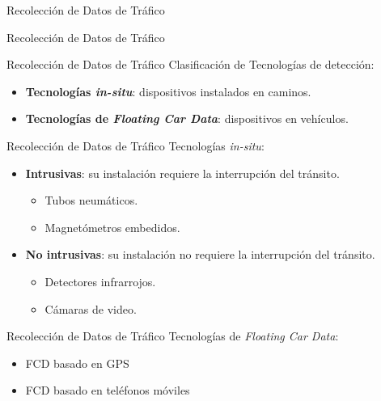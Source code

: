 \begin{frame}[c]{Recolección de Datos de Tráfico}
	\begin{center}
		\huge{Recolección de Datos de Tráfico}
    \end{center}
\end{frame}

\begin{frame}[c]{Recolección de Datos de Tráfico}
	\large{Clasificación de Tecnologías de detección:}
	\vspace{\baselineskip}
	\begin{center}
	 \begin{itemize}	 	
	 	\item \textbf{Tecnologías \emph{in-situ}}: dispositivos instalados en caminos.
	 	\vspace{\baselineskip}
	 	\item \textbf{Tecnologías de \emph{Floating Car Data}}: dispositivos en vehículos.
	 \end{itemize}			
	\end{center}
\end{frame}

\begin{frame}[c]{Recolección de Datos de Tráfico}
	\large{Tecnologías \emph{in-situ}:}
	\vspace{\baselineskip}
	\begin{center}
		\begin{itemize}	 	
			\item \textbf{Intrusivas}: su instalación requiere la interrupción del tránsito.
			\begin{itemize}	 	
				\item Tubos neumáticos.
				\item Magnetómetros embedidos.
			\end{itemize}	
			\vspace{\baselineskip}
			\item \textbf{No intrusivas}: su instalación no requiere la interrupción del tránsito.
			\begin{itemize}	 	
				\item Detectores infrarrojos.
				\item Cámaras de video.
			\end{itemize}
		\end{itemize}			
	\end{center}
\end{frame}

\begin{frame}[c]{Recolección de Datos de Tráfico}
	\large{Tecnologías de \emph{Floating Car Data}:}
	\vspace{\baselineskip}
	\begin{center}
		\begin{itemize}	 	
			\item FCD basado en GPS	
			\vspace{\baselineskip}
			\item FCD basado en teléfonos móviles
		\end{itemize}			
	\end{center}
\end{frame}